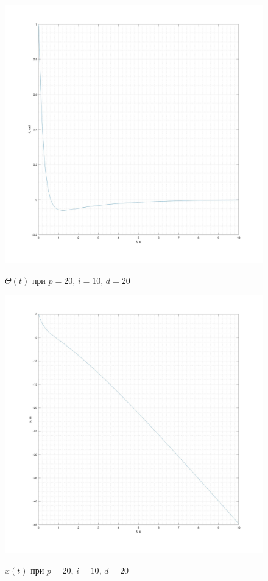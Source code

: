 \documentclass[a5paper, 10pt]{article}
\theoremstyle{definition}
\theoremstyle{plain}
\theoremstyle{remark}
\begin{document}
\begin{figure}[!h]
		{\includegraphics[width=1\linewidth]{"./graphics/tet_20_10_20.jpg"}}
	           \caption{$\Theta (t)$ при $p = 20, \, i = 10, \, d = 20$}
\end{figure}
\begin{figure}[!h]
		{\includegraphics[width=1\linewidth]{"./graphics/x_20_10_20.jpg"}}
	           \caption{$x(t)$  при $p = 20, \, i = 10, \, d = 20$}
\end{figure}
\end{document}
